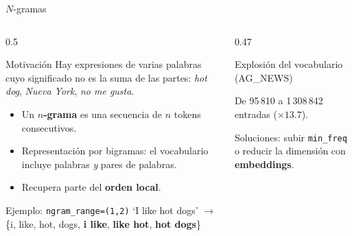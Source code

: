 \documentclass[aspectratio=169, 10pt]{beamer}
\begin{document}
\begin{frame}{$N$-gramas}

	\begin{columns}[T]
		\begin{column}{0.5\textwidth}
			\begin{block}{Motivaci\'on}
				\small
				Hay expresiones de varias palabras cuyo significado no es la suma de las partes: \emph{hot dog}, \emph{Nueva York}, \emph{no me gusta}.
			\end{block}

			\begin{itemize}
				\small
				\item Un \textbf{$n$-grama} es una secuencia de $n$ tokens consecutivos.
				\item Representaci\'on por bigramas: el vocabulario incluye palabras \emph{y} pares de palabras.
				\item Recupera parte del \textbf{orden local}.
			\end{itemize}

			\vspace{0.2cm}

			\begin{block}{Ejemplo: \texttt{ngram\_range=(1,2)}}
				\scriptsize
				`I like hot dogs' $\to$ \{i, like, hot, dogs, \textbf{i like}, \textbf{like hot}, \textbf{hot dogs}\}
			\end{block}
		\end{column}

		\begin{column}{0.47\textwidth}
			\begin{alertblock}{Explosi\'on del vocabulario (AG\_NEWS)}
				\centering

				\small
				De 95\,810 a 1\,308\,842 entradas ($\times 13.7$).
			\end{alertblock}

			\small
			Soluciones: subir \texttt{min\_freq} o reducir la dimensi\'on con \textbf{embeddings}.
		\end{column}
	\end{columns}

\end{frame}
\end{document}
